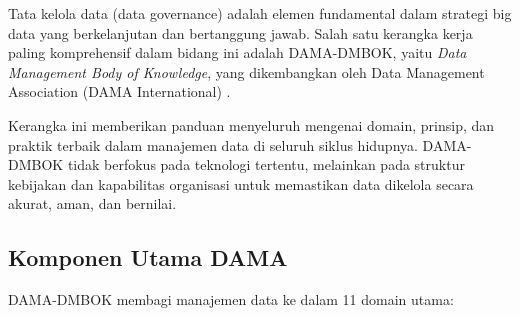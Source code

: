 Tata kelola data (data governance) adalah elemen fundamental dalam strategi big data yang berkelanjutan dan bertanggung jawab. Salah satu kerangka kerja paling komprehensif dalam bidang ini adalah DAMA-DMBOK, yaitu \textit{Data Management Body of Knowledge}, yang dikembangkan oleh Data Management Association (DAMA International) \cite{dama2017}.

Kerangka ini memberikan panduan menyeluruh mengenai domain, prinsip, dan praktik terbaik dalam manajemen data di seluruh siklus hidupnya. DAMA-DMBOK tidak berfokus pada teknologi tertentu, melainkan pada struktur kebijakan dan kapabilitas organisasi untuk memastikan data dikelola secara akurat, aman, dan bernilai.

\subsection{Komponen Utama DAMA}

DAMA-DMBOK membagi manajemen data ke dalam 11 domain utama:

